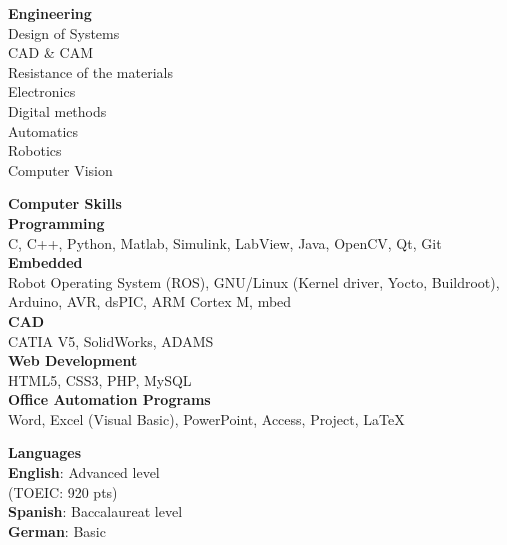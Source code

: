 \documentclass[a4paper,11pt,final]{memoir}
\newcommand{\SmallSep}{\vspace{0.5em}}
\newcommand{\SkillSection}[1]
	{\normalsize{\textbf{#1\\}}\normalfont\small}%
\newcommand{\SkillItem}[1]
{\vspace{0.25em}\textbf{\color{RoyalBlue} #1}\normalfont}
\begin{document}
\begin{flushleft}
\SkillSection{Engineering}
Design of Systems\\
CAD \& CAM\\
Resistance of the materials\\
Electronics\\
Digital methods\\
Automatics\\
Robotics\\
Computer Vision
\SmallSep

\SkillSection{Computer Skills}
\vspace{-0.25em}
\SkillItem{Programming}\\
C, C++, Python, Matlab, Simulink, LabView, Java, OpenCV, Qt, Git\\
\SkillItem{Embedded}\\
Robot Operating System (ROS), GNU/Linux (Kernel driver, Yocto, Buildroot), Arduino, AVR, dsPIC, ARM Cortex M, mbed\\
\SkillItem{CAD}\\
CATIA V5, SolidWorks, ADAMS\\
\SkillItem{Web Development}\\
HTML5, CSS3, PHP, MySQL\\
\SkillItem{Office Automation Programs}\\
Word, Excel (Visual Basic), PowerPoint, Access, Project, \LaTeX\\
\SmallSep

\SkillSection{Languages}
\vspace{-0.25em}
\SkillItem{English}: Advanced level\\
(TOEIC: 920 pts)\\
\SkillItem{Spanish}: Baccalaureat level\\
\SkillItem{German}: Basic
\SmallSep


\end{flushleft}
\end{document}
